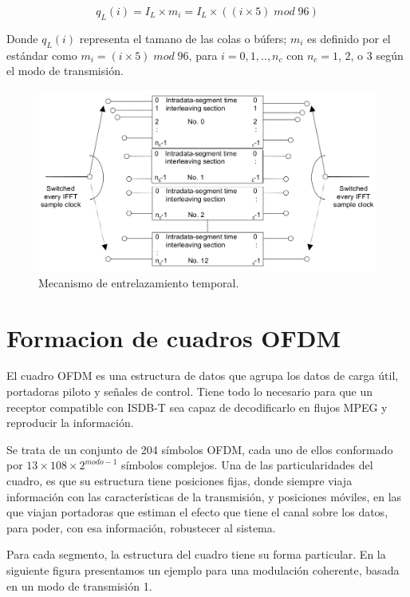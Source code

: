 \begin{equation}
q_L(i) = I_L \times m_i = I_L \times ((i \times 5) \; mod \; 96)
\end{equation}

Donde $q_L(i)$ representa el tamano de las colas o búfers; $m_i$ es definido por el est\'andar como $m_i = (i \times 5) \; mod \; 96$, para $i = 0, 1,..,n_c$ con $n_c = 1$, $2$, o $3$ seg\'un el modo de transmisi\'on. 

\begin{figure}[!h]
\centering
\includegraphics[scale=0.4]{figuras/cap05/entrelazamiento_temporal}
\caption{\label{f:entrelazamiento_temporal} Mecanismo de entrelazamiento temporal.}
\end{figure}



\section{Formacion de cuadros OFDM}
El cuadro OFDM es una estructura de datos que agrupa los datos de carga \'util, portadoras piloto y señales de control. Tiene todo lo necesario para que un receptor compatible con ISDB-T sea capaz de decodificarlo en flujos MPEG y reproducir la informaci\'on.

Se trata de un conjunto de 204 s\'imbolos OFDM, cada uno de ellos conformado por $13 \times 108 \times 2^{modo -1}$ s\'imbolos complejos. Una de las particularidades del cuadro, es que su estructura tiene posiciones fijas, donde siempre viaja información con las características de la transmisión, y posiciones móviles, en las que viajan portadoras que estiman el efecto que tiene el canal sobre los datos, para poder, con esa información, robustecer al sistema. 

Para cada segmento, la estructura del cuadro tiene su forma particular. En la siguiente figura presentamos un ejemplo para una modulación coherente, basada en un modo de transmisión 1.

